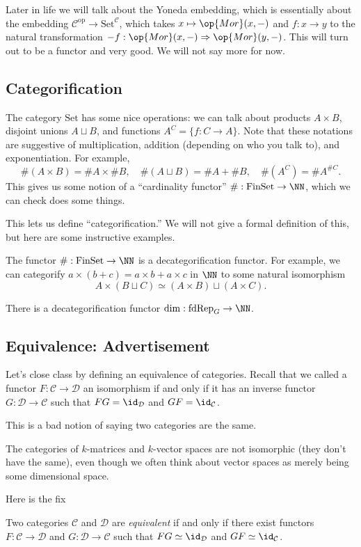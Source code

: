 \begin{remark}
	Later in life we will talk about the Yoneda embedding, which is essentially about the embedding $\mathcal C^\mathrm{op}\to\mathrm{Set}^\mathcal C$, which takes $x\mapsto\op{Mor}(x,-)$ and $f:x\to y$ to the natural transformation $-f:\op{Mor}(x,-)\Rightarrow\op{Mor}(y,-)$. This will turn out to be a functor and very good. We will not say more for now.
\end{remark}

\subsection{Categorification}
The category $\mathrm{Set}$ has some nice operations: we can talk about products $A\times B$, disjoint unions $A\sqcup B$, and functions $A^C=\{f:C\to A\}$. Note that these notations are suggestive of multiplication, addition (depending on who you talk to), and exponentiation. For example,
\[\#(A\times B)=\#A\times\#B,\quad\#(A\sqcup B)=\#A+\#B,\quad\#\left(A^C\right)=\#A^{\#C}.\]
This gives us some notion of a ``cardinality functor'' $\#:\mathrm{FinSet}\to\NN$, which we can check does some things.

This lets us define ``categorification.'' We will not give a formal definition of this, but here are some instructive examples.
\begin{example}
	The functor $\#:\mathrm{FinSet}\to\NN$ is a decategorification functor. For example, we can categorify $a\times(b+c)=a\times b+a\times c$ in $\NN$ to some natural isomorphism
	\[A\times(B\sqcup C)\simeq (A\times B)\sqcup (A\times C).\]
\end{example}
\begin{example}
	There is a decategorification functor $\dim:\mathrm{fdRep}_G\to\NN$.
\end{example}

\subsection{Equivalence: Advertisement}
Let's close class by defining an equivalence of categories. Recall that we called a functor $F:\mathcal C\to\mathcal D$ an isomorphism if and only if it has an inverse functor $G:\mathcal D\to\mathcal C$ such that $FG=\id_\mathcal D$ and $GF=\id_\mathcal C$.

This is a bad notion of saying two categories are the same.
\begin{example}
	The categories of $k$-matrices and $k$-vector spaces are not isomorphic (they don't have the same), even though we often think about vector spaces as merely being some dimensional space.
\end{example}
Here is the fix
\begin{definition}[Equivalence]
	Two categories $\mathcal C$ and $\mathcal D$ are \textit{equivalent} if and only if there exist functors $F:\mathcal C\to\mathcal D$ and $G:\mathcal D\to\mathcal C$ such that $FG\simeq\id_{\mathcal D}$ and $GF\simeq\id_\mathcal C$.
\end{definition}